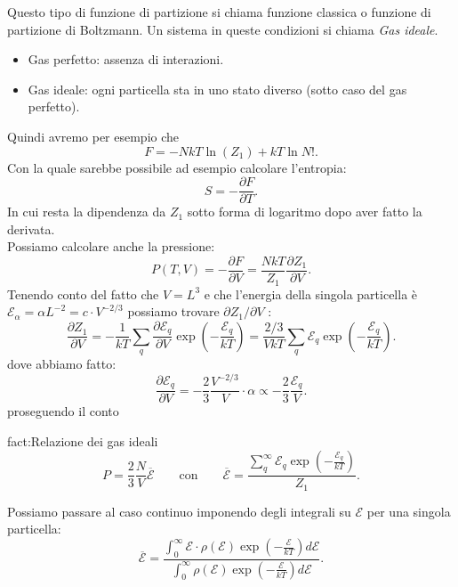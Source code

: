 Questo tipo di funzione di partizione si chiama funzione classica o funzione di partizione di Boltzmann. Un sistema in queste condizioni si chiama \textit{Gas ideale}.
\begin{itemize}
	\item Gas perfetto: assenza di interazioni.
	\item Gas ideale: ogni particella sta in uno stato diverso (sotto caso del gas perfetto).
\end{itemize} \label{def:gas-ideale}
Quindi avremo per esempio che
\[
	F = -NkT \ln \left( Z_1 \right) + kT \ln N!
.\] 
Con la quale sarebbe possibile ad esempio calcolare l'entropia:
\[
	S = - \frac{\partial F}{\partial T} 
.\] 
In cui resta la dipendenza da $Z_1$ sotto forma di logaritmo dopo aver fatto la derivata.\\
Possiamo calcolare anche la pressione:
\[
	P\left( T,V \right) = - \frac{\partial F}{\partial V} = \frac{NkT}{Z_1} \frac{\partial Z_1}{\partial V} 
.\] 
Tenendo conto del fatto che $V = L^3$ e che l'energia della singola particella è $\mathcal{E}_{\alpha}= \alpha L^{-2} = c \cdot V^{-2 /3}$ possiamo trovare $\partial Z_1 /\partial V $ :
\[
	\frac{\partial Z_1}{\partial V}  = - \frac{1}{kT}\sum_{q}^{} \frac{\partial \mathcal{E}_{q}}{\partial V} \exp\left( - \frac{\mathcal{E}_{q}}{kT} \right) = 
	\frac{2 /3}{VkT} \sum_{q}^{} \mathcal{E}_{q}\exp\left( -\frac{\mathcal{E}_{q}}{kT} \right) 
.\] 
dove abbiamo fatto:
\[
    \frac{\partial \mathcal{E}_{q}}{\partial V} = -\frac{2}{3}\frac{V^{-2 /3}}{V}\cdot \alpha \propto -\frac{2}{3}\frac{\mathcal{E}_{q}}{V} 
.\] 
proseguendo il conto
\begin{fact}{fact:Relazione dei gas ideali}
\[
	P = \frac{2}{3}\frac{N}{V}\overline{\mathcal{E}} \quad \quad \text{con} \quad \quad \overline{\mathcal{E}} = \frac{\sum_{q}^{\infty} \mathcal{E}_{q}\exp\left( - \frac{\mathcal{E}_{q}}{kT} \right) }{Z_1}
.\] 
\end{fact}
Possiamo passare al caso continuo  imponendo degli integrali su $\mathcal{E}$ per una singola particella:
\[
	\overline{\mathcal{E}} = \frac{\int_{0}^{\infty} \mathcal{E}\cdot  \rho\left( \mathcal{E} \right) \exp\left( -\frac{\mathcal{E}}{kT} \right) d\mathcal{E}}{\int_{0}^{\infty}\rho\left( \mathcal{E} \right) \exp \left( -\frac{\mathcal{E}}{kT} \right) d\mathcal{E}}
.\] 
